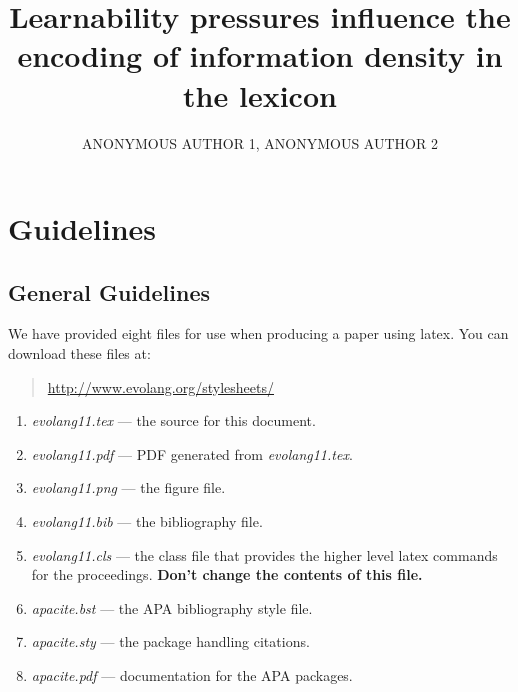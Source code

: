 \documentclass{evolang11}
\begin{document}
\title{Learnability pressures influence the encoding of information density in the lexicon}

\author{ANONYMOUS AUTHOR 1, ANONYMOUS AUTHOR 2}

\address{University Department, University Name \\ City, Country\\email1@university, email2@university}  

\maketitle


\section{Guidelines}

\subsection{General Guidelines}

We have provided eight files for use when producing a paper using latex. You can download these files at: 

\begin{quote}
\url{http://www.evolang.org/stylesheets/}
\end{quote}

\begin{enumerate}

\item {\em evolang11.tex} --- the source for this document. 

\item {\em evolang11.pdf} --- PDF generated from {\em evolang11.tex}.

\item {\em evolang11.png} --- the figure file.

\item {\em evolang11.bib} --- the bibliography file.

\item {\em evolang11.cls} --- the class file that provides the higher
level latex commands for the proceedings. \textbf{Don't change the contents of this file.}
 
\item {\em apacite.bst} --- the APA bibliography style file.
  
\item {\em apacite.sty} --- the package handling citations.

\item {\em apacite.pdf} --- documentation for the APA packages.

\end{enumerate}
\end{document}
